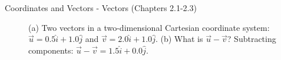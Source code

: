 \documentclass{beamer}
\begin{document}
\begin{frame}{Coordinates and Vectors - Vectors (Chapters 2.1-2.3)}
\begin{figure}
\centering
{}
\caption{\label{fig:twovectors2} (a) Two vectors in a two-dimensional Cartesian coordinate system: $\vec{u} = 0.5\hat{i}+1.0\hat{j}$ and $\vec{v} = 2.0\hat{i}+1.0\hat{j}$.  (b) What is $\vec{u}-\vec{v}$?  Subtracting components: $\vec{u}-\vec{v} = 1.5\hat{i}+0.0\hat{j}$.}
\end{figure}
\end{frame}
\end{document}
